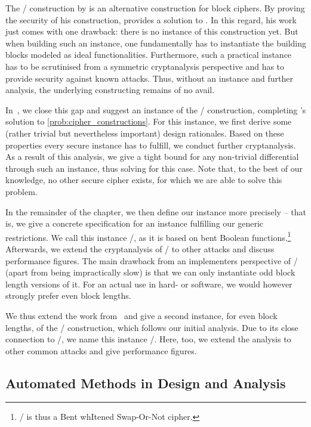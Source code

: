 The \WSN/ construction by \textcite{AC:Tessaro15} is an alternative construction for block ciphers.
By proving the security of his construction, \citeauthor{AC:Tessaro15} provides a solution to .
In this regard, his work just comes with one drawback: there is no instance of this construction yet.
But when building such an instance, one fundamentally has to instantiate the building blocks modeled as ideal functionalities.
Furthermore, such a practical instance has to be scrutinised from a symmetric cryptanalysis perspective and has to provide security against known attacks.
Thus, without an instance and further analysis, the underlying constructing remains of no avail.

In~\cite{EC:CLLNW19}, we close this gap and suggest an instance of the \WSN/ construction, completing \citeauthor{AC:Tessaro15}'s solution to \cref{prob:cipher_constructions}.
For this instance, we first derive some (rather trivial but nevertheless important) design rationales.
Based on these properties every secure instance has to fulfill, we conduct further cryptanalysis.
As a result of this analysis, we give a tight bound for any non-trivial differential through such an instance, thus solving  for this case.
Note that, to the best of our knowledge, no other secure cipher exists, for which we are able to solve this problem.

In the remainder of the chapter, we then define our instance more precisely -- that is, we give a concrete specification for an instance fulfilling our generic restrictions.
We call this instance \bison/, as it is based on bent Boolean functions.\footnote{%
    \bison/ is thus a Bent whItened Swap-Or-Not cipher.
}
Afterwards, we extend the cryptanalysis of \bison/ to other attacks and discuss performance figures.
The main drawback from an implementers perspective of \bison/ (apart from being impractically slow) is that we can only instantiate odd block length versions of it.
For an actual use in hard- or software, we would however strongly prefer even block lengths.

We thus extend the work from~\cite{EC:CLLNW19} and give a second instance, for even block lengths, of the \WSN/ construction, which follows our initial analysis.
Due to its close connection to \bison/, we name this instance \wisent/.
Here, too, we extend the analysis to other common attacks and give performance figures.

\subsection{Automated Methods in Design and Analysis}

